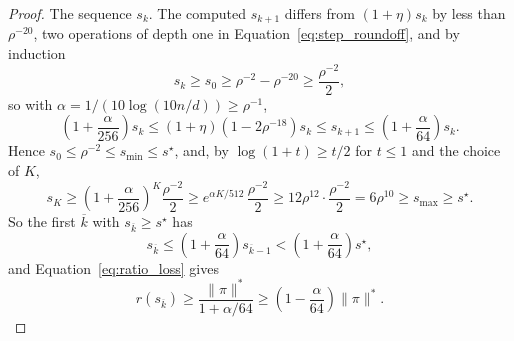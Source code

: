 \documentclass[11pt]{article}
\begin{document}
\begin{proof}
The sequence $s_k$.
The computed $s_{k + 1}$ differs from
$(1 + \eta) s_k$ by less than
$\rho^{-20}$, two operations of depth one in Equation~\eqref{eq:step_roundoff},
and by induction
\[
s_k
\ge
s_0
\ge
\rho^{-2} - \rho^{-20}
\ge
\frac{\rho^{-2}}{2},
\]
so with $\alpha = 1 / (10 \log(10 n / d)) \ge \rho^{-1}$,
\[
\left( 1 + \frac{\alpha}{256} \right) s_k
\le
(1 + \eta) \left( 1 - 2 \rho^{-18} \right) s_k
\le
s_{k + 1}
\le
\left( 1 + \frac{\alpha}{64} \right) s_k .
\]
Hence $s_0 \le \rho^{-2} \le s_{\min} \le s^{\star}$, and, by
$\log(1 + t) \ge t / 2$ for
$t \le 1$ and the choice of
$K$,
\[
s_K
\ge
\left( 1 + \frac{\alpha}{256} \right)^{K} \frac{\rho^{-2}}{2}
\ge
e^{\alpha K / 512} \, \frac{\rho^{-2}}{2}
\ge
12 \rho^{12} \cdot \frac{\rho^{-2}}{2}
=
6 \rho^{10}
\ge
s_{\max}
\ge
s^{\star} .
\]
So the first $\overline{k}$ with
$s_{\overline{k}} \ge s^{\star}$ has
\[
s_{\overline{k}}
\le
\left( 1 + \frac{\alpha}{64} \right) s_{\overline{k} - 1}
<
\left( 1 + \frac{\alpha}{64} \right) s^{\star},
\]
and Equation~\eqref{eq:ratio_loss} gives
\begin{equation}
\label{eq:good_k}
r(s_{\overline{k}})
\ge
\frac{\|\pi\|^{*}}{1 + \alpha / 64}
\ge
\left( 1 - \frac{\alpha}{64} \right) \|\pi\|^{*} .
\end{equation}


\end{proof}
\end{document}
